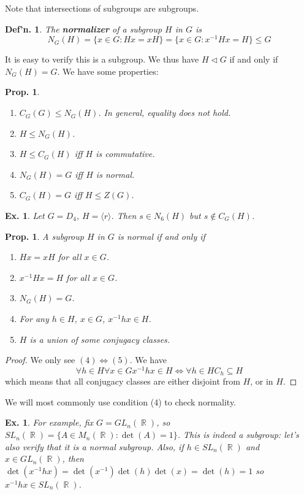\documentclass[12pt, a4paper]{book}
\DeclareMathOperator{\R}{\mathbb{R}}
\newtheorem{definition}[theorem]{Def'n.}
\newtheorem{proposition}[theorem]{Prop.}
\newtheorem{example}[theorem]{Ex.}
\theoremstyle{nonumberplain}
\newtheorem{proof}{Proof}
\begin{document}
Note that intersections of subgroups are subgroups.
\begin{definition}
    The \textbf{normalizer} of a subgroup $H$ in $G$ is
    \[N_G(H)=\{x\in G:Hx=xH\}=\{x\in G:x^{-1}Hx=H\}\leq G\]
\end{definition}
It is easy to verify this is a subgroup.
We thus have $H\triangleleft G$ if and only if $N_G(H)=G$.
We have some properties:
\begin{proposition}
    \begin{enumerate}
        \item $C_G(G)\leq N_G(H)$.
            In general, equality does not hold.
        \item $H\leq N_G(H)$.
        \item $H\leq C_G(H)$ iff $H$ is commutative.
        \item $N_G(H)=G$ iff $H$ is normal.
        \item $C_G(H)=G$ iff $H\leq Z(G)$.
    \end{enumerate}
\end{proposition}
\begin{example}
    Let $G=D_4$, $H=\langle r\rangle$.
    Then $s\in N_6(H)$ but $s\notin C_G(H)$.
\end{example}
\begin{proposition}
    A subgroup $H$ in $G$ is normal if and only if
    \begin{enumerate}
        \item $Hx=xH$ for all $x\in G$.
        \item $x^{-1}Hx=H$ for all $x\in G$.
        \item $N_G(H)=G$.
        \item For any $h\in H$, $x\in G$, $x^{-1}hx\in H$.
        \item $H$ is a union of some conjugacy classes.
    \end{enumerate}
\end{proposition}
\begin{proof}
    We only see $(4)\Leftrightarrow (5)$.
    We have
    \[\forall h\in H\forall x\in G x^{-1}hx\in H\Leftrightarrow\forall h\in H C_h\subseteq H\]
    which means that all conjugacy classes are either disjoint from $H$, or in $H$.
\end{proof}
We will most commonly use condition (4) to check normality.
\begin{example}
    For example, fix $G=GL_n(\R)$, so $SL_n(\R)=\{A\in M_n(\R):\det(A)=1\}$.
    This is indeed a subgroup: let's also verify that it is a normal subgroup.
    Also, if $h\in SL_n(\R)$ and $x\in GL_n(\R)$, then $\det(x^{-1}hx)=\det(x^{-1})\det(h)\det(x)=\det(h)=1$ so $x^{-1}hx\in SL_n(\R)$.
\end{example}
\end{document}
